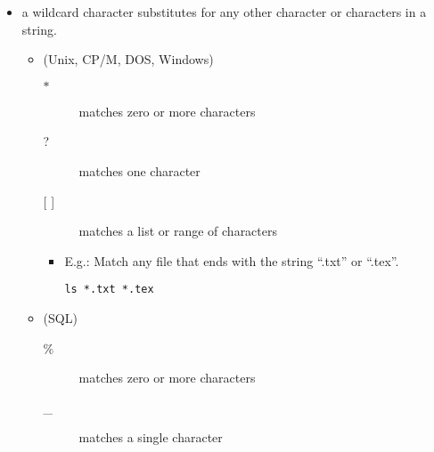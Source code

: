 \documentclass[a4paper,landscape,headrule,footrule,xetex]{foils}
\begin{document}
\MyLogo{}

\begin{itemize}
\item  a wildcard character  substitutes for any other character or characters in a string.
  \begin{itemize}
  \item {} (Unix, CP/M, DOS, Windows)
    \begin{description}
    \item[$*$] matches zero or more characters
    \item[?] matches one character
    \item[{[ ]}] matches a list or range of characters
    \end{description}
    \begin{itemize}
      \item E.g.:  Match any file that ends with the string ``.txt'' or ``.tex''.
\begin{verbatim}
ls *.txt *.tex
\end{verbatim}
     \end{itemize}
    \item {} (SQL)
    \begin{description}
    \item[\%]  matches zero or more characters
    \item[\_] matches a single character
    \end{description}
  \end{itemize}
\end{itemize}
\end{document}
